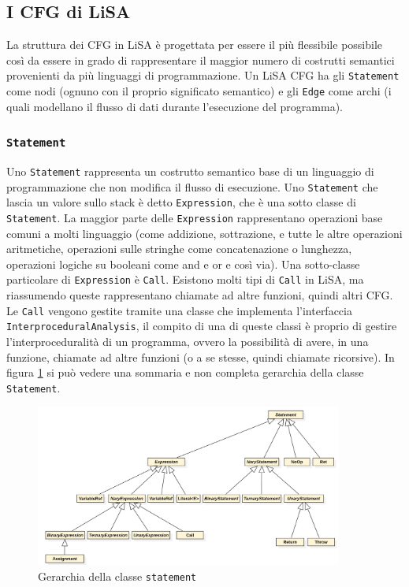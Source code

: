 \subsection{I CFG di LiSA}
La struttura dei CFG in LiSA è progettata per essere il più flessibile possibile così da essere in grado di rappresentare il maggior numero di costrutti semantici provenienti da più linguaggi di programmazione. Un LiSA CFG ha gli \texttt{Statement} come nodi (ognuno con il proprio significato semantico) e gli \texttt{Edge} come archi (i quali modellano il flusso di dati durante l'esecuzione del programma). 

\subsubsection{\texttt{Statement}}
Uno \texttt{Statement} rappresenta un costrutto semantico base di un linguaggio di programmazione che non modifica il flusso di esecuzione. Uno \texttt{Statement} che lascia un valore sullo stack è detto \texttt{Expression}, che è una sotto classe di \texttt{Statement}. La maggior parte delle \texttt{Expression} rappresentano operazioni base comuni a molti linguaggio (come addizione, sottrazione, e tutte le altre operazioni aritmetiche, operazioni sulle stringhe come concatenazione o lunghezza, operazioni logiche su booleani come and e or e così via). Una sotto-classe particolare di \texttt{Expression} è \texttt{Call}. Esistono molti tipi di \texttt{Call} in LiSA, ma riassumendo queste rappresentano chiamate ad altre funzioni, quindi altri CFG. Le \texttt{Call} vengono gestite tramite una classe che implementa l'interfaccia \texttt{InterproceduralAnalysis}, il compito di una di queste classi è proprio di gestire l'interproceduralità di un programma, ovvero la possibilità di avere, in una funzione, chiamate ad altre funzioni (o a se stesse, quindi chiamate ricorsive). In figura \ref{fig:gerarchiaStatement} si può vedere una sommaria e non completa gerarchia della classe \texttt{Statement}.

\begin{figure}[ht]
	\centering
	\includegraphics[width=0.9\textwidth]{Immagini/gerarchiaStatement.png}
	\caption{Gerarchia della classe \texttt{statement}}
	\label{fig:gerarchiaStatement}
\end{figure}

